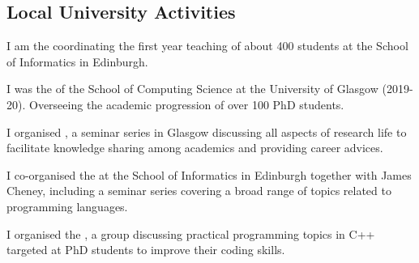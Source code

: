 \subsection{Local University Activities}
\begin{cvitemize}
  \item I am the  coordinating the first year teaching of about 400 students at the School of Informatics in Edinburgh.
\end{cvitemize}
\begin{cvitemize}
  \item I was the  of the School of Computing Science at the University of Glasgow ({\small 2019-20}).
        Overseeing the academic progression of over 100 PhD students.
\end{cvitemize}
\begin{cvitemize}
  \item I organised , a seminar series in Glasgow discussing all aspects of research life to facilitate knowledge sharing among academics and providing career advices.
\end{cvitemize}
\begin{cvitemize}
  \item I co-organised the  at the School of Informatics in Edinburgh together with James Cheney, including a seminar series covering a broad range of topics related to programming languages.
\end{cvitemize}
\begin{cvitemize}
  \item I organised the , a group discussing practical programming topics in C++ targeted at PhD students to improve their coding skills.
\end{cvitemize}
